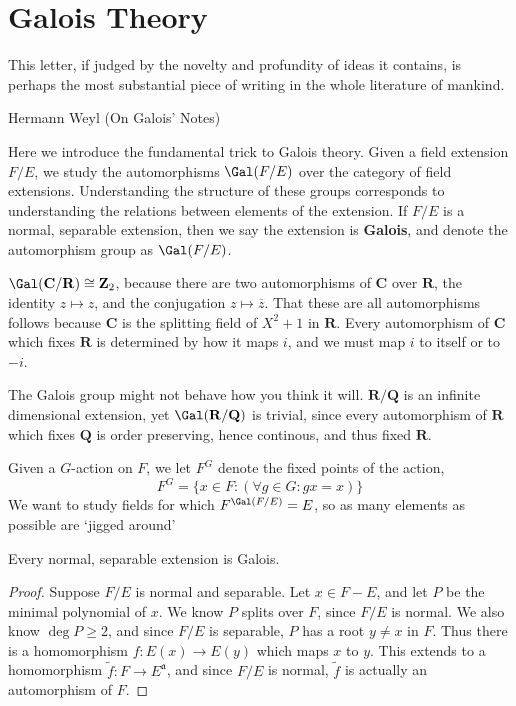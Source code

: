 \chapter{Galois Theory}

\epigraph{This letter, if judged by the novelty and profundity of ideas it contains, is perhaps the most substantial piece of writing in the whole literature of mankind.}{Hermann Weyl (On Galois' Notes)}

Here we introduce the fundamental trick to Galois theory. Given a field extension $F/E$, we study the automorphisms $\Gal(F/E)$ over the category of field extensions. Understanding the structure of these groups corresponds to understanding the relations between elements of the extension. If $F/E$ is a normal, separable extension, then we say the extension is {\bf Galois}, and denote the automorphism group as $\Gal(F/E)$.

\begin{example}
    $\Gal(\mathbf{C}/\mathbf{R}) \cong \mathbf{Z}_2$, because there are two automorphisms of $\mathbf{C}$ over $\mathbf{R}$, the identity $z \mapsto z$, and the conjugation $z \mapsto \overline{z}$. That these are all automorphisms follows because $\mathbf{C}$ is the splitting field of $X^2 + 1$ in $\mathbf{R}$. Every automorphism of $\mathbf{C}$ which fixes $\mathbf{R}$ is determined by how it maps $i$, and we must map $i$ to itself or to $-i$.
\end{example}

\begin{example}
    The Galois group might not behave how you think it will. $\mathbf{R}/\mathbf{Q}$ is an infinite dimensional extension, yet $\Gal(\mathbf{R}/\mathbf{Q})$ is trivial, since every automorphism of $\mathbf{R}$ which fixes $\mathbf{Q}$ is order preserving, hence continous, and thus fixed $\mathbf{R}$.
\end{example}

Given a $G$-action on $F$, we let $F^G$ denote the fixed points of the action,
%
\[ F^G = \{ x \in F: (\forall g \in G : gx = x) \} \]
%
We want to study fields for which $F^{\Gal(F/E)} = E$, so as many elements as possible are `jigged around'

\begin{theorem}
    Every normal, separable extension is Galois.
\end{theorem}
\begin{proof}
    Suppose $F/E$ is normal and separable. Let $x \in F - E$, and let $P$ be the minimal polynomial of $x$. We know $P$ splits over $F$, since $F/E$ is normal. We also know $\deg P \geq 2$, and since $F/E$ is separable, $P$ has a root $y \neq x$ in $F$. Thus there is a homomorphism $f: E(x) \to E(y)$ which maps $x$ to $y$. This extends to a homomorphism $\tilde{f}: F \to E^\mathfrak{a}$, and since $F/E$ is normal, $\tilde{f}$ is actually an automorphism of $F$.
\end{proof}

